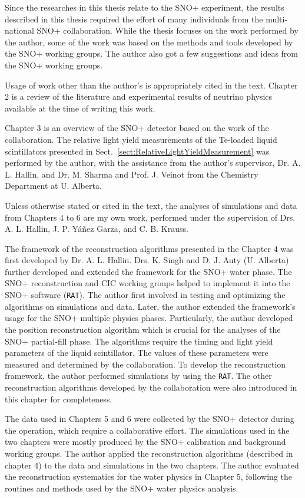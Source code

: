 Since the researches in this thesis relate to the SNO+ experiment, the results described in this thesis required the effort of many individuals from the multi-national SNO+ collaboration. While the thesis focuses on the work performed by the author, some of the work was based on the methods and tools developed by the SNO+ working groups. The author also got a few suggestions and ideas from the SNO+ working groups.

Usage of work other than the author's is appropriately cited in the text. Chapter 2 is a review of the literature and experimental results of neutrino physics available at the time of writing this work. 

Chapter 3 is an overview of the SNO+ detector based on the work of the collaboration. The relative light yield measurements of the Te-loaded liquid scintillators presented in Sect.~\ref{sect:RelativeLightYieldMeasurement} was performed by the author, with the assistance from the author's supervisor, Dr. A. L. Hallin, and Dr. M. Sharma and Prof. J. Veinot from the Chemistry Department at U. Alberta.

Unless otherwise stated or cited in the text, the analyses of simulations and data from Chapters 4 to 6 are my own work, performed under the supervision of Drs. A. L. Hallin, J. P. Y\'{a}\~{n}ez Garza, and C. B. Krauss. 

The framework of the reconstruction algorithms presented in the Chapter 4 was first developed by Dr. A. L. Hallin. Drs. K. Singh and D. J. Auty (U. Alberta) further developed and extended the framework for the SNO+ water phase. The SNO+ reconstruction and CIC working groups helped to implement it into the SNO+ software (\texttt{RAT}). The author first involved in testing and optimizing the algorithms on simulations and data. Later, the author extended the framework's usage for the SNO+ multiple physics phases. Particularly, the author developed the position reconstruction algorithm which is crucial for the analyses of the SNO+ partial-fill phase. The algorithms require the timing and light yield parameters of the liquid scintillator. The values of these parameters were measured and determined by the collaboration. To develop the reconstruction framework, the author performed simulations by using the \texttt{RAT}. The other reconstruction algorithms developed by the collaboration were also introduced in this chapter for completeness.
 
The data used in Chapters 5 and 6 were collected by the SNO+ detector during the operation, which require a collaborative effort. The simulations used in the two chapters were mostly produced by the SNO+ calibration and background working groups. The author applied the reconstruction algorithms (described in chapter 4) to the data and simulations in the two chapters. The author evaluated the reconstruction systematics for the water physics in Chapter 5, following the routines and methods used by the SNO+ water physics analysis.

